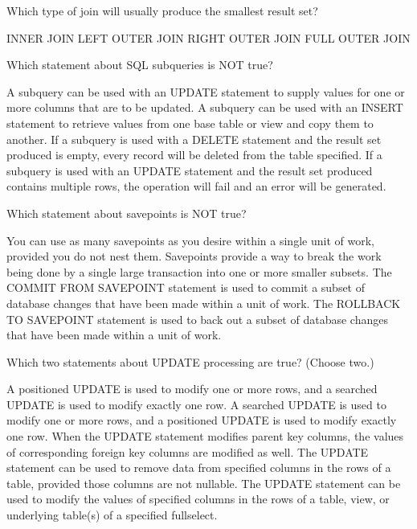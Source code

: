 \documentclass[11pt]{exam}
\begin{document}
\begin{questions}
\question[1]
Which type of join will usually produce the smallest result set?
\begin{choices}
\choice INNER JOIN
\choice LEFT OUTER JOIN
\choice RIGHT OUTER JOIN
\choice FULL OUTER JOIN
\end{choices}

\question[1]
Which statement about SQL subqueries is NOT true?
\begin{choices}
\choice A subquery can be used with an UPDATE statement to supply values for one or more columns 
that are to be updated.
\choice A subquery can be used with an INSERT statement to retrieve values from one base table or view
and copy them to another.
\choice If a subquery is used with a DELETE statement and the result set produced is empty, every record
will be deleted from the table specified.
\choice If a subquery is used with an UPDATE statement and the result set produced contains multiple rows,
the operation will fail and an error will be generated.
\end{choices}

\newpage
\question[1]
Which statement about savepoints is NOT true?
\begin{choices}
\choice You can use as many savepoints as you desire within a single unit of work, provided you do not
nest them.
\choice Savepoints provide a way to break the work being done by a single large transaction into one or
more smaller subsets.
\choice The COMMIT FROM SAVEPOINT statement is used to commit a subset of database changes that have
been made within a unit of work.
\choice The ROLLBACK TO SAVEPOINT statement is used to back out a subset of database changes that have
been made within a unit of work.
\end{choices}

\question[1]
Which two statements about UPDATE processing are true? (Choose two.)
\begin{choices}
\choice A positioned UPDATE is used to modify one or more rows, and a searched UPDATE is used to 
modify exactly one row.
\choice A searched UPDATE is used to modify one or more rows, and a positioned UPDATE is used to
modify exactly one row.
\choice When the UPDATE statement modifies parent key columns, the values of corresponding foreign key
columns are modified as well.
\choice The UPDATE statement can be used to remove data from specified columns in the rows of a table,
provided those columns are not nullable.
\choice The UPDATE statement can be used to modify the values of specified columns in the rows
of a table, view, or underlying table(s) of a specified fullselect.
\end{choices} 


\end{questions}
\end{document}
